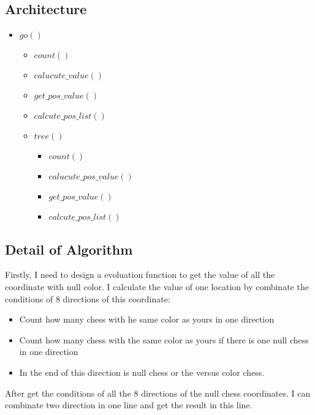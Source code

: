 \documentclass[conference,compsoc]{IEEEtran}
\begin{document}
\subsection{Architecture}
\begin{itemize}
  \item $go()$
  \begin{itemize}
    \item $count()$
    \item $calucute\_value()$
    \item $get\_pos\_value()$
    \item $calcute\_pos\_list()$
    \item $tree()$
    \begin{itemize}
      \item $count()$
      \item $calucute\_pos\_value()$
      \item $get\_pos\_value()$ 
      \item $calcute\_pos\_list()$
    \end{itemize}
  \end{itemize}
\end{itemize}


\subsection{Detail of Algorithm}
  Firstly, I need to design a evoluation function to get the value of all the coordinate with null color.
  I calculate the value of one location by combinate the conditions of 8 directions of this coordinate:
  \begin{itemize}
    \item Count how many chess with he same color as yours in one direction
    \item Count how many chess with the same color as yours if there is one null chess in one direction
    \item In the end of this direction is null chess or the versus color chess.
  \end{itemize}
  \begin{algorithm}
    \begin{algorithmic}[1]
    \end{algorithmic}
  \end{algorithm}

  After get the conditions of all the 8 directions of the null chess coordinates.
  I can combinate two direction in one line and get the result in this line.
\end{document}
